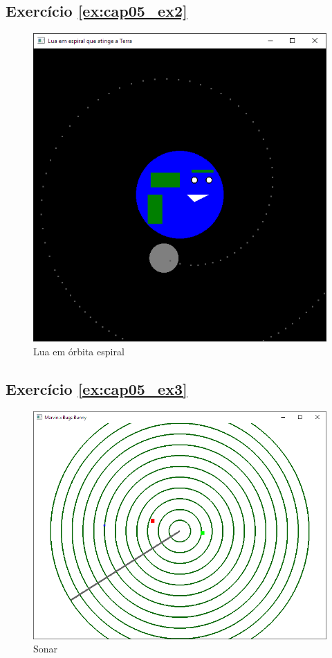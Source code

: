 \subsection*{Exercício \ref{ex:cap05_ex2} }
\begin{figure}[ht]
  \centerline{\includegraphics[width=.5\textwidth]{img/cap5_ex19.png}}
  \caption{Lua em órbita espiral}
  \label{fig:cap04_ex1}
\end{figure}


\subsection*{Exercício \ref{ex:cap05_ex3} }
\begin{figure}[ht]
  \centerline{\includegraphics[width=.5\textwidth]{img/cap5_ex20.png}}
  \caption{Sonar}
  \label{fig:cap04_ex1}
\end{figure}
